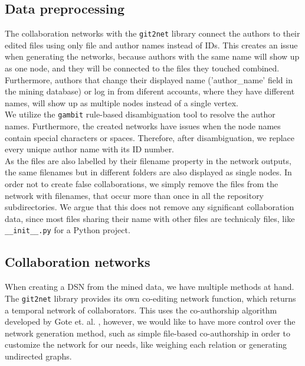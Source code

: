 \subsection{Data preprocessing}

The collaboration networks with the \texttt{git2net} library connect the authors to their edited files using only file and author names instead of IDs. This creates an issue when generating the networks, because authors with the same name will show up as one node, and they will be connected to the files they touched combined. Furthermore, authors that change their displayed name ('author\_name' field in the mining database) or log in from diferent accounts, where they have different names, will show up as multiple nodes instead of a single vertex. \\

We utilize the \texttt{gambit} \cite{goteGambitOpenSource2021} rule-based disambiguation tool to resolve the author names. Furthermore, the created networks have issues when the node names contain special characters or spaces. Therefore, after disambiguation, we replace every unique author name with its ID number. \\

As the files are also labelled by their filename property in the network outputs, the same filenames but in different folders are also displayed as single nodes. In order not to create false collaborations, we simply remove the files from the network with filenames, that occur more than once in all the repository subdirectories. We argue that this does not remove any significant collaboration data, since most files sharing their name with other files are technicaly files, like \texttt{\_\_init\_\_.py} for a Python project. \\

\subsection{Collaboration networks}

When creating a DSN from the mined data, we have multiple methods at hand. The \texttt{git2net} library provides its own co-editing network function, which returns a temporal network of collaborators. This uses the co-authorship algorithm developed by Gote et. al. \cite{goteAnalysingTimeStampedCoEditing2019}, however, we would like to have more control over the network generation method, such as simple file-based co-authorship in order to customize the network for our needs, like weighing each relation or generating undirected graphs. \\

